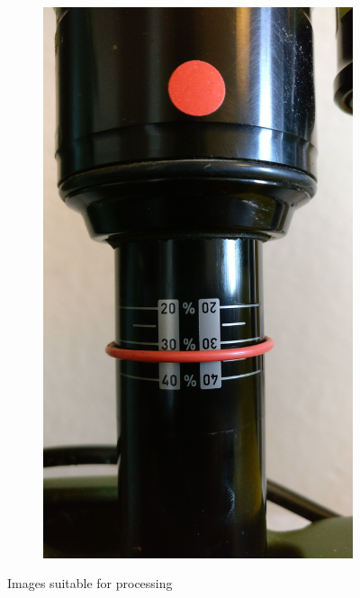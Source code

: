 \begin{figure}[h!]
\begin{subfigure}[t]{0.5\textwidth}
				\includegraphics[scale=0.05]{../images/results/150_rs.jpg}
			\end{subfigure}
			\caption{Images suitable for processing}
			\label{fig:application_images}
		\end{figure}
